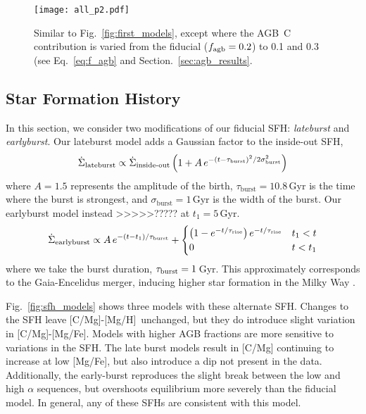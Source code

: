 \documentclass[fleqn,usenatbib]{mnras}
\newcommand{\agb}{AGB}
\newcommand{\sfh}{SFH} %
\newcommand{\caah}{[C/Mg]-[Mg/H]}
\newcommand{\caafe}{[C/Mg]-[Mg/Fe]}
\begin{document}
\begin{figure}
\centering
\texttt{[image: all\_p2.pdf]}

\caption[]{Similar to Fig.~\ref{fig:first_models}, except where the \agb\ C contribution is varied from the fiducial ($f_{\rm agb}=0.2$) to 0.1 and 0.3 (see Eq.~\ref{eq:f_agb} and Section.~\ref{sec:agb_results}.}
\label{fig:caafe_agbs}
\end{figure}





\subsection{Star Formation History} \label{sec:sfh}

In this section, we consider two modifications of our fiducial \sfh{}: \textit{lateburst} and \textit{earlyburst}.
Our lateburst model adds a Gaussian factor to the inside-out \sfh{},
\begin{equation}\label{eq:lateburst}
    \dot{\Sigma}_\text{lateburst} \propto \dot{\Sigma}_\text{inside-out} \left(1 + A\,e^{-(t-\tau_{\rm burst})^2/2\sigma^2_{\rm burst}} \right)
\end{equation}
where $A=1.5$ represents the amplitude of the birth, $\tau_\text{burst}=10.8$\,Gyr is the time where the burst is strongest, and $\sigma_\text{burst}=1$\,Gyr is the width of the burst.
Our earlyburst model instead >>>>>?????  at $t_1=5$\,Gyr. 
\begin{equation}\label{eq:twoinfall}
    \dot{\Sigma}_{\rm earlyburst} \propto A\,e^{-(t-t_1)/\tau_{\rm burst}} + 
\begin{cases}
    \left(1-e^{-t/\tau_\text{rise}}\right)e^{-t/\tau_\text{rise}} & t_1 < t \\
      0 & t<t_1
\end{cases}
\end{equation}
where we take the burst duration, $\tau_{\rm burst}=1$\,Gyr.
This approximately corresponds to the Gaia-Encelidus merger, inducing higher star formation in the Milky Way \citep{spitoni21, bonaca20, helmi18}.

Fig.~\ref{fig:sfh_models} shows three models with these alternate \sfh{}. Changes to the \sfh{} leave \caah\ unchanged, but they do introduce slight variation in \caafe. Models with higher \agb{} fractions are more sensitive to variations in the \sfh{}. The late burst models result in [C/Mg] continuing to increase at low [Mg/Fe], but also introduce a dip not present in the data. Additionally, the early-burst
reproduces the slight break between the low and high $\alpha$ sequences, but overshoots equilibrium more severely than the fiducial model. 
In general, any of these \sfh{}s are consistent with this model.
\end{document}
